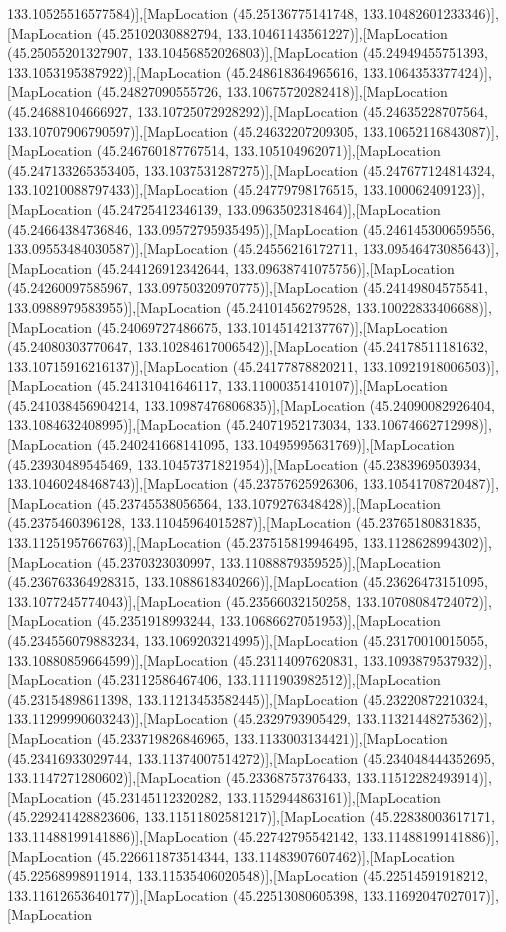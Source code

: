 133.10525516577584)],[MapLocation (45.25136775141748, 133.10482601233346)],[MapLocation (45.25102030882794, 133.10461143561227)],[MapLocation (45.25055201327907, 133.10456852026803)],[MapLocation (45.24949455751393, 133.1053195387922)],[MapLocation (45.248618364965616, 133.1064353377424)],[MapLocation (45.24827090555726, 133.10675720282418)],[MapLocation (45.24688104666927, 133.10725072928292)],[MapLocation (45.24635228707564, 133.10707906790597)],[MapLocation (45.24632207209305, 133.10652116843087)],[MapLocation (45.246760187767514, 133.105104962071)],[MapLocation (45.247133265353405, 133.1037531287275)],[MapLocation (45.247677124814324, 133.10210088797433)],[MapLocation (45.24779798176515, 133.100062409123)],[MapLocation (45.24725412346139, 133.0963502318464)],[MapLocation (45.24664384736846, 133.09572795935495)],[MapLocation (45.246145300659556, 133.09553484030587)],[MapLocation (45.24556216172711, 133.09546473085643)],[MapLocation (45.244126912342644, 133.09638741075756)],[MapLocation (45.24260097585967, 133.09750320970775)],[MapLocation (45.24149804575541, 133.0988979583955)],[MapLocation (45.24101456279528, 133.10022833406688)],[MapLocation (45.24069727486675, 133.10145142137767)],[MapLocation (45.24080303770647, 133.10284617006542)],[MapLocation (45.24178511181632, 133.10715916216137)],[MapLocation (45.24177878820211, 133.10921918006503)],[MapLocation (45.24131041646117, 133.11000351410107)],[MapLocation (45.241038456904214, 133.10987476806835)],[MapLocation (45.24090082926404, 133.1084632408995)],[MapLocation (45.24071952173034, 133.10674662712998)],[MapLocation (45.240241668141095, 133.10495995631769)],[MapLocation (45.23930489545469, 133.10457371821954)],[MapLocation (45.2383969503934, 133.10460248468743)],[MapLocation (45.23757625926306, 133.10541708720487)],[MapLocation (45.23745538056564, 133.1079276348428)],[MapLocation (45.2375460396128, 133.11045964015287)],[MapLocation (45.23765180831835, 133.1125195766763)],[MapLocation (45.237515819946495, 133.1128628994302)],[MapLocation (45.2370323030997, 133.11088879359525)],[MapLocation (45.236763364928315, 133.1088618340266)],[MapLocation (45.23626473151095, 133.1077245774043)],[MapLocation (45.23566032150258, 133.10708084724072)],[MapLocation (45.2351918993244, 133.10686627051953)],[MapLocation (45.234556079883234, 133.1069203214995)],[MapLocation (45.23170010015055, 133.10880859664599)],[MapLocation (45.23114097620831, 133.1093879537932)],[MapLocation (45.23112586467406, 133.1111903982512)],[MapLocation (45.23154898611398, 133.11213453582445)],[MapLocation (45.23220872210324, 133.11299990603243)],[MapLocation (45.2329793905429, 133.11321448275362)],[MapLocation (45.233719826846965, 133.1133003134421)],[MapLocation (45.23416933029744, 133.11374007514272)],[MapLocation (45.234048444352695, 133.1147271280602)],[MapLocation (45.23368757376433, 133.11512282493914)],[MapLocation (45.23145112320282, 133.1152944863161)],[MapLocation (45.229241428823606, 133.11511802581217)],[MapLocation (45.22838003617171, 133.11488199141886)],[MapLocation (45.22742795542142, 133.11488199141886)],[MapLocation (45.226611873514344, 133.11483907607462)],[MapLocation (45.22568998911914, 133.11535406020548)],[MapLocation (45.22514591918212, 133.11612653640177)],[MapLocation (45.22513080605398, 133.11692047027017)],[MapLocation 